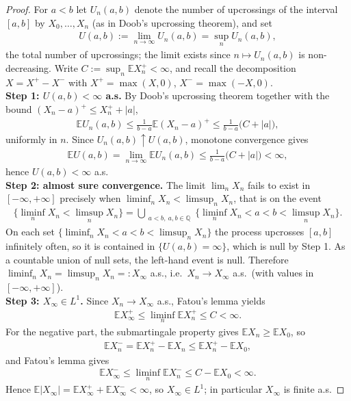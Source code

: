 \begin{proof}
	For $a < b$ let $U_n(a, b)$ denote the number of upcrossings of the interval $[a, b]$ by $X_0, \dots, X_n$ (as in Doob's upcrossing theorem), and set
	\begin{align*}
		U(a, b) := \lim_{n \rightarrow \infty} U_n(a, b) = \sup_n U_n(a, b),
	\end{align*}
	the total number of upcrossings; the limit exists since $n \mapsto U_n(a, b)$ is non-decreasing. Write $C := \sup_n \mathbb{E} X_n^+ < \infty$, and recall the decomposition $X = X^+ - X^-$ with $X^+ = \max(X, 0)$, $X^- = \max(-X, 0)$.\\
	\textbf{Step 1: $U(a, b) < \infty$ a.s.} By Doob's upcrossing theorem together with the bound $(X_n - a)^+ \le X_n^+ + |a|$,
	\begin{align*}
		\mathbb{E} U_n(a, b) \le \frac{1}{b - a} \mathbb{E}(X_n - a)^+ \le \frac{1}{b - a}\big( C + |a| \big),
	\end{align*}
	uniformly in $n$. Since $U_n(a, b) \uparrow U(a, b)$, monotone convergence gives
	\begin{align*}
		\mathbb{E} U(a, b) = \lim_{n \rightarrow \infty} \mathbb{E} U_n(a, b) \le \frac{1}{b - a}\big( C + |a| \big) < \infty,
	\end{align*}
	hence $U(a, b) < \infty$ a.s.\\
	\textbf{Step 2: almost sure convergence.} The limit $\lim_n X_n$ fails to exist in $[-\infty, +\infty]$ precisely when $\liminf_n X_n < \limsup_n X_n$, that is on the event
	\begin{align*}
		\Big\{ \liminf_n X_n < \limsup_n X_n \Big\} = \bigcup_{\substack{a < b,\ a, b \in \mathbb{Q}}} \big\{ \liminf_n X_n < a < b < \limsup_n X_n \big\}.
	\end{align*}
	On each set $\{ \liminf_n X_n < a < b < \limsup_n X_n \}$ the process upcrosses $[a, b]$ infinitely often, so it is contained in $\{ U(a, b) = \infty \}$, which is null by Step 1. As a countable union of null sets, the left-hand event is null. Therefore $\liminf_n X_n = \limsup_n X_n =: X_\infty$ a.s., i.e.\ $X_n \rightarrow X_\infty$ a.s.\ (with values in $[-\infty, +\infty]$).\\
	\textbf{Step 3: $X_\infty \in L^1$.} Since $X_n \rightarrow X_\infty$ a.s., Fatou's lemma yields
	\begin{align*}
		\mathbb{E} X_\infty^+ \le \liminf_n \mathbb{E} X_n^+ \le C < \infty.
	\end{align*}
	For the negative part, the submartingale property gives $\mathbb{E} X_n \ge \mathbb{E} X_0$, so
	\begin{align*}
		\mathbb{E} X_n^- = \mathbb{E} X_n^+ - \mathbb{E} X_n \le \mathbb{E} X_n^+ - \mathbb{E} X_0,
	\end{align*}
	and Fatou's lemma gives
	\begin{align*}
		\mathbb{E} X_\infty^- \le \liminf_n \mathbb{E} X_n^- \le C - \mathbb{E} X_0 < \infty.
	\end{align*}
	Hence $\mathbb{E}|X_\infty| = \mathbb{E} X_\infty^+ + \mathbb{E} X_\infty^- < \infty$, so $X_\infty \in L^1$; in particular $X_\infty$ is finite a.s.
\end{proof}
